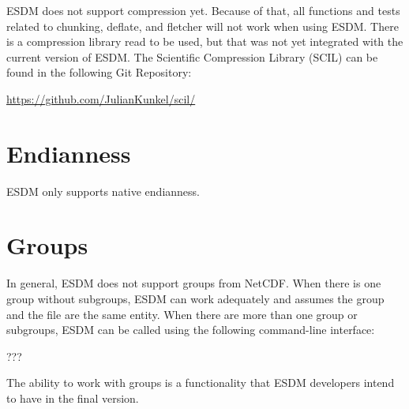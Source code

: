 \tab
ESDM does not support compression yet. Because of that, all functions and tests related to chunking, deflate, and fletcher will not work when using ESDM. There is a compression library read to be used, but that was not yet integrated with the current version of ESDM. The Scientific Compression Library (SCIL) can be found in the following Git Repository:

\begin{center}
\url{https://github.com/JulianKunkel/scil/}
\end{center}

\section{Endianness}

\tab
ESDM only supports native endianness.

\section{Groups}

\tab
In general, ESDM does not support groups from NetCDF. When there is one group without subgroups, ESDM can work adequately and assumes the group and the file are the same entity. When there are more than one group or subgroups, ESDM can be called using the following command-line interface:

???

The ability to work with groups is a functionality that ESDM developers intend to have in the final version.

